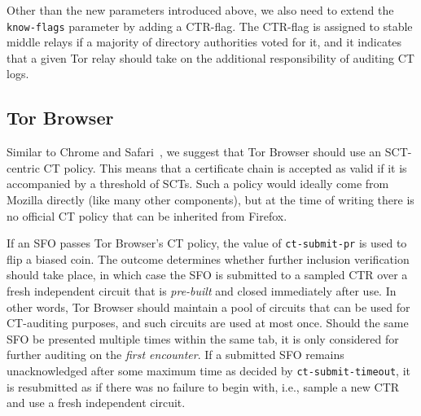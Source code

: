 Other than the new parameters introduced above, we also need to extend the
\texttt{know-flags} parameter by adding a CTR-flag.  The CTR-flag is 
assigned to stable middle relays if a majority of directory authorities voted
for it, and it indicates that a given Tor relay should take on the additional
responsibility of auditing CT logs.


\subsection{Tor Browser}
Similar to Chrome and Safari~\cite{chrome-policy,safari-policy}, we suggest that
Tor Browser should use an SCT-centric CT policy.  This means that a certificate
chain is accepted as valid if it is accompanied by a threshold of SCTs.  Such a
policy would ideally come from Mozilla directly (like many other components),
but at the time of writing there is no official CT policy that can be inherited
from Firefox.

If an SFO passes Tor Browser's CT policy, the value of
\texttt{ct-submit-pr} is used to flip a biased coin.  The outcome determines
whether further inclusion verification should take place, in which case the SFO
is submitted to a sampled CTR over a fresh independent circuit
that is \emph{pre-built} and closed immediately after use.  In other words, Tor
Browser should maintain a pool of circuits that can be used for CT-auditing
purposes, and such circuits are used at most once.
Should the same SFO be presented multiple times within the same tab, it is only
considered for further auditing on the \emph{first encounter}.
If a submitted SFO remains unacknowledged after some maximum time
as decided by \texttt{ct-submit-timeout}, it is resubmitted as if there was no
failure to begin with, i.e., sample a new CTR and use a fresh independent
circuit.

